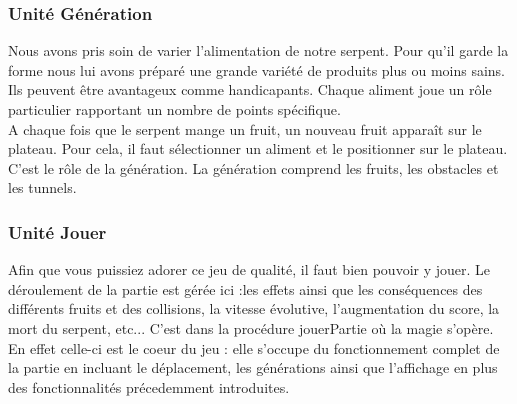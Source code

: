 \documentclass[11pt,a4paper]{article}
\begin{document}
            \newpage
        
        \subsubsection{Unité Génération}
        
        Nous avons pris soin de varier l’alimentation de notre serpent. Pour qu’il garde la forme nous lui avons préparé une grande variété de produits plus ou moins sains. Ils peuvent être avantageux comme handicapants. 
        Chaque aliment joue un rôle particulier rapportant un nombre de points spécifique. \\
        A chaque fois que le serpent mange un fruit, un nouveau fruit apparaît sur le plateau. Pour cela, il faut sélectionner un aliment et le positionner sur le plateau. C’est le rôle de la génération. La génération comprend les fruits, les obstacles et les tunnels.
 
		\begin{algorithm}
		
		
		
		
		
		\end{algorithm}
		\newpage
		
        \subsubsection{Unité Jouer}
        
        Afin que vous puissiez adorer ce jeu de qualité, il faut bien pouvoir y jouer. Le déroulement de la partie est gérée ici :les effets ainsi que les conséquences des différents fruits et des collisions, la vitesse évolutive, l'augmentation du score, la mort du serpent, etc... C'est dans la procédure jouerPartie où la magie s'opère. En effet celle-ci est le coeur du jeu : elle s'occupe du fonctionnement complet de la partie en incluant le déplacement, les générations ainsi que l'affichage en plus des fonctionnalités précedemment introduites. 
        
\end{document}
